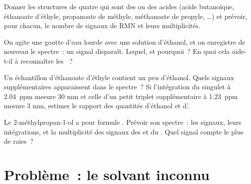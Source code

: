 \begin{exercise}[$\star\star\star$]\label{exo:g12:proton-nmr:12}
Donner les structures de quatre   qui sont des 
ou des acides (acide butanoïque, éthanoate d'éthyle, propanoate de
méthyle, méthanoate de propyle, \dots) et prévoir, pour chacun, le
nombre de signaux de RMN et leurs multiplicités.
\end{exercise}

\begin{exercise}[$\star\star\star$]\label{exo:g12:proton-nmr:13}
On agite une goutte d'eau lourde  avec une solution d'éthanol,
et on enregistre de nouveau le spectre~: un signal disparaît. Lequel, et
pourquoi~? En quoi cela aide-t-il à reconnaître les  ~?
\end{exercise}

\begin{exercise}[$\star\star\star$]\label{exo:g12:proton-nmr:14}
Un échantillon d'éthanoate d'éthyle contient un peu d'éthanol. Quels
signaux supplémentaires apparaissent dans le spectre~? Si l'intégration
du singulet à \qty{2.04}{ppm} mesure 30 mm et celle d'un petit triplet
supplémentaire à \qty{1.23}{ppm} mesure 3 mm, estimer le rapport des
quantités d'éthanol et d'.
\end{exercise}

\begin{exercise}[$\star\star\star$]\label{exo:g12:proton-nmr:15}
Le 2-méthylpropan-1-ol a pour formule . Prévoir son
spectre~: les signaux, leurs intégrations, et la multiplicité des
signaux des  et du . Quel signal compte le plus de
raies~?
\end{exercise}

\section{Problème~: le solvant inconnu}

